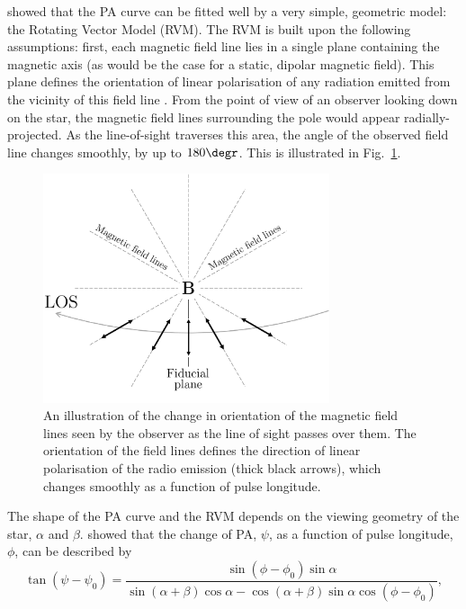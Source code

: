 \citet{RCxx1969} showed that the PA curve can be fitted well by a very simple, geometric model: the Rotating Vector Model (RVM). The RVM is built upon the following assumptions: first, each magnetic field line lies in a single plane containing the magnetic axis (as would be the case for a static, dipolar magnetic field). This plane defines the orientation of linear polarisation of any radiation emitted from the vicinity of this field line \citep[e.g.][]{Cxxx2015}. From the point of view of an observer looking down on the star, the magnetic field lines surrounding the pole would appear radially-projected. As the line-of-sight traverses this area, the angle of the observed field line changes smoothly, by up to $180\degr$. This is illustrated in Fig.~\ref{fig: intro - RVM field line schematic}.
\begin{figure}
    \begin{center}
        \includegraphics[width=0.75\textwidth]{Figures/Introduction/PA_curve_illustration}
        \caption[Polarisation vector on the Poincar\'e sphere]{An illustration of the change in orientation of the magnetic field lines seen by the observer as the line of sight passes over them. The orientation of the field lines defines the direction of linear polarisation of the radio emission (thick black arrows), which changes smoothly as a function of pulse longitude.}
        \label{fig: intro - RVM field line schematic}
    \end{center}
\end{figure}
The shape of the PA curve and the RVM depends on the viewing geometry of the star, $\alpha$ and $\beta$. \citet{Kxxx1970} showed that the change of PA, $\psi$, as a function of pulse longitude, $\phi$, can be described by 
\begin{equation}
    \label{eq: intro - RVM}
        \tan(\psi - \psi_0) = \frac{\sin(\phi-\phi_0)\sin\alpha}{\sin(\alpha+\beta)\cos\alpha-\cos(\alpha+\beta)\sin\alpha\cos(\phi-\phi_0)},
\end{equation}
